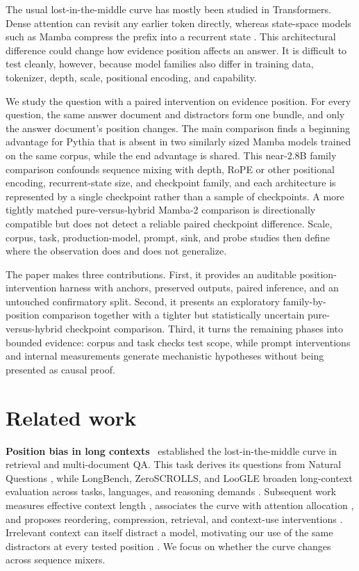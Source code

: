 \documentclass{article}
\newcommand{\runin}[1]{\par\medskip\noindent\textbf{#1}\ }
\begin{document}
The usual lost-in-the-middle curve has mostly been studied in Transformers.
Dense attention can revisit any earlier token directly, whereas state-space models such as Mamba compress the prefix into a recurrent state \citep{gu2023mamba,dao2024mamba2}.
This architectural difference could change how evidence position affects an answer.
It is difficult to test cleanly, however, because model families also differ in training data, tokenizer, depth, scale, positional encoding, and capability.

We study the question with a paired intervention on evidence position.
For every question, the same answer document and distractors form one bundle, and only the answer document's position changes.
The main comparison finds a beginning advantage for Pythia that is absent in two similarly sized Mamba models trained on the same corpus, while the end advantage is shared.
This near-2.8B family comparison confounds sequence mixing with depth, RoPE or other positional encoding, recurrent-state size, and checkpoint family, and each architecture is represented by a single checkpoint rather than a sample of checkpoints.
A more tightly matched pure-versus-hybrid Mamba-2 comparison is directionally compatible but does not detect a reliable paired checkpoint difference.
Scale, corpus, task, production-model, prompt, sink, and probe studies then define where the observation does and does not generalize.

The paper makes three contributions.
First, it provides an auditable position-intervention harness with anchors, preserved outputs, paired inference, and an untouched confirmatory split.
Second, it presents an exploratory family-by-position comparison together with a tighter but statistically uncertain pure-versus-hybrid checkpoint comparison.
Third, it turns the remaining phases into bounded evidence: corpus and task checks test scope, while prompt interventions and internal measurements generate mechanistic hypotheses without being presented as causal proof.

\section{Related work}
\label{sec:related}

\runin{Position bias in long contexts}
\citet{liu2024lost} established the lost-in-the-middle curve in retrieval and multi-document QA.
This task derives its questions from Natural Questions \citep{kwiatkowski2019nq}, while LongBench, ZeroSCROLLS, and LooGLE broaden long-context evaluation across tasks, languages, and reasoning demands \citep{bai2024longbench,shaham2023zeroscrolls,li2024loogle}.
Subsequent work measures effective context length \citep{hsieh2024ruler}, associates the curve with attention allocation \citep{hsieh2024found}, and proposes reordering, compression, retrieval, and context-use interventions \citep{an2024make,peysakhovich2023attention,jiang2024longllmlingua,xu2024recomp,agrawal2024rr}.
Irrelevant context can itself distract a model, motivating our use of the same distractors at every tested position \citep{shi2023distracted}.
We focus on whether the curve changes across sequence mixers.
\end{document}

